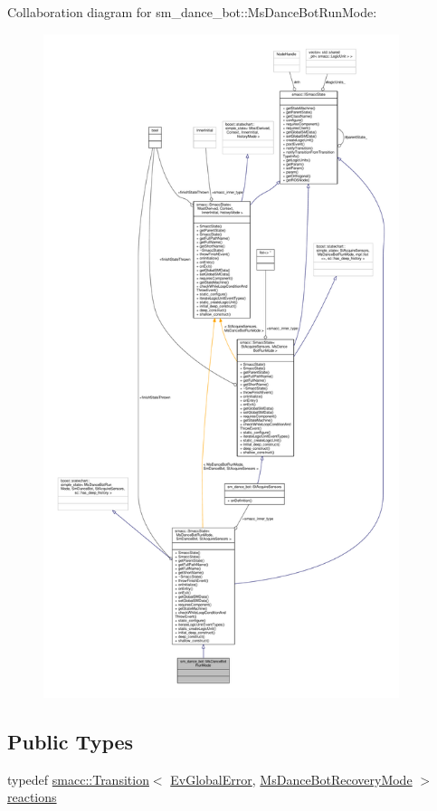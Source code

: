 Collaboration diagram for sm\+\_\+dance\+\_\+bot\+:\+:Ms\+Dance\+Bot\+Run\+Mode\+:\nopagebreak
\begin{figure}[H]
\begin{center}
\leavevmode
\includegraphics[height=550pt]{classsm__dance__bot_1_1MsDanceBotRunMode__coll__graph}
\end{center}
\end{figure}
\subsection*{Public Types}
\begin{DoxyCompactItemize}
\item 
typedef \hyperlink{classsmacc_1_1Transition}{smacc\+::\+Transition}$<$ \hyperlink{structsm__dance__bot_1_1EvGlobalError}{Ev\+Global\+Error}, \hyperlink{classsm__dance__bot_1_1MsDanceBotRecoveryMode}{Ms\+Dance\+Bot\+Recovery\+Mode} $>$ \hyperlink{classsm__dance__bot_1_1MsDanceBotRunMode_a6c0769229c9d5601d25c82c2bead6b33}{reactions}
\end{DoxyCompactItemize}
